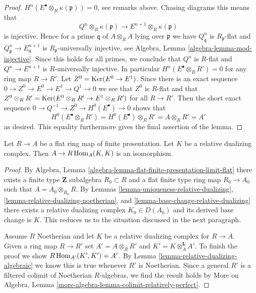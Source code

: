 \begin{proof}
$H^n(E^\bullet \otimes_R \kappa(\mathfrak p)) = 0$, see remarks above.
Chasing diagrams this means that
$$
Q^n \otimes_R \kappa(\mathfrak p) \to E^{n + 1} \otimes_R \kappa(\mathfrak p)
$$
is injective. Hence for a prime $\mathfrak q$ of $A \otimes_R A$
lying over $\mathfrak p$ we have $Q^n_\mathfrak q$ is $R_\mathfrak p$-flat
and $Q^n_\mathfrak p \to E^{n + 1}_\mathfrak q$ is
$R_\mathfrak p$-universally injective, see
Algebra, Lemma \ref{algebra-lemma-mod-injective}.
Since this holds for all primes,
we conclude that $Q^n$ is $R$-flat
and $Q^n \to E^{n + 1}$ is $R$-universally injective. In particular
$H^n(E^\bullet \otimes_R R') = 0$ for any ring map $R \to R'$.
Let $Z^0 = \mathop{\mathrm{Ker}}(E^0 \to E^1)$. Since there is an exact sequence
$0 \to Z^0 \to E^0 \to E^1 \to Q^1 \to 0$ we see that $Z^0$
is $R$-flat and that
$Z^0 \otimes_R R' = \mathop{\mathrm{Ker}}(E^0 \otimes_R R' \to E^1 \otimes_R R')$
for all $R \to R'$. Then the short exact sequence
$0 \to Q^{-1} \to Z^0 \to H^0(E^\bullet) \to 0$
shows that
$$
H^0(E^\bullet \otimes_R R') = H^0(E^\bullet) \otimes_R R'
= A \otimes_R R' = A'
$$
as desired. This equality furthermore gives the final assertion
of the lemma.
\end{proof}

\begin{lemma}
\label{lemma-relative-dualizing-RHom}
Let $R \to A$ be a flat ring map of finite presentation.
Let $K$ be a relative dualizing complex.
Then $A \to R\mathop{\mathrm{Hom}}\nolimits_A(K, K)$ is an isomorphism.
\end{lemma}

\begin{proof}
By
Algebra, Lemma \ref{algebra-lemma-flat-finite-presentation-limit-flat}
there exists a finite type $\mathbf{Z}$ subalgebra $R_0 \subset R$
and a flat finite type ring map $R_0 \to A_0$ such that
$A = A_0 \otimes_{R_0} R$. By Lemmas
\ref{lemma-uniqueness-relative-dualizing},
\ref{lemma-relative-dualizing-noetherian}, and
\ref{lemma-base-change-relative-dualizing}
there exists a relative dualizing complex $K_0 \in D(A_0)$
and its derived base change is $K$.
This reduces us to the situation discussed in the next paragraph.

\medskip\noindent
Assume $R$ Noetherian and let $K$ be a relative dualizing complex
for $R \to A$. Given a ring map $R \to R'$ set $A' = A \otimes_R R'$
and $K' = K \otimes_A^\mathbf{L} A'$. To finish the proof we show
$R\mathop{\mathrm{Hom}}\nolimits_{A'}(K', K') = A'$. By Lemma \ref{lemma-relative-dualizing-algebraic}
we know this is true whenever $R'$ is Noetherian.
Since a general $R'$ is a filtered colimit of Noetherian
$R$-algebras, we find the result holds by
More on Algebra, Lemma \ref{more-algebra-lemma-colimit-relatively-perfect}.
\end{proof}

